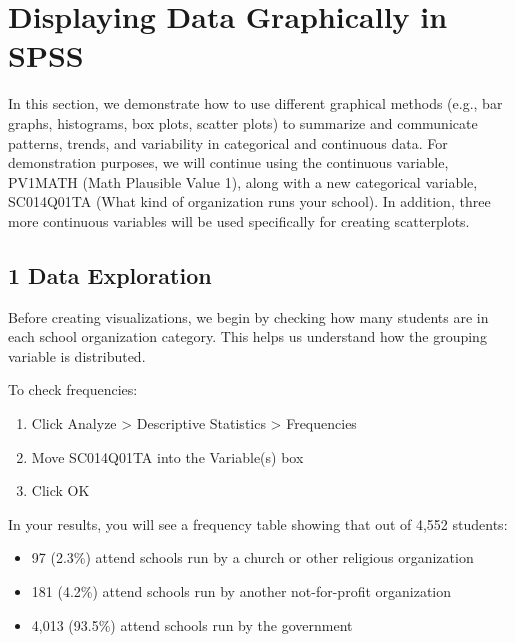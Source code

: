 \documentclass[
  letterpaper,
  DIV=11,
  numbers=noendperiod]{scrreprt}
\begin{document}

\chapter*{Displaying Data Graphically in
SPSS}\label{displaying-data-graphically-in-spss}


In this section, we demonstrate how to use different graphical methods
(e.g., bar graphs, histograms, box plots, scatter plots) to summarize
and communicate patterns, trends, and variability in categorical and
continuous data. For demonstration purposes, we will continue using the
continuous variable, PV1MATH (Math Plausible Value 1), along with a new
categorical variable, SC014Q01TA (What kind of organization runs your
school). In addition, three more continuous variables will be used
specifically for creating scatterplots.

\section*{1 Data Exploration}\label{data-exploration}


Before creating visualizations, we begin by checking how many students
are in each school organization category. This helps us understand how
the grouping variable is distributed.

To check frequencies:

\begin{enumerate}
\def\labelenumi{\arabic{enumi}.}
\item
  Click Analyze \textgreater{} Descriptive Statistics \textgreater{}
  Frequencies
\item
  Move SC014Q01TA into the Variable(s) box
\item
  Click OK
\end{enumerate}

In your results, you will see a frequency table showing that out of
4,552 students:

\begin{itemize}
\item
  97 (2.3\%) attend schools run by a church or other religious
  organization
\item
  181 (4.2\%) attend schools run by another not-for-profit organization
\item
  4,013 (93.5\%) attend schools run by the government
\end{itemize}
\end{document}
